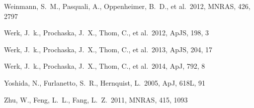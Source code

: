 \documentclass[useAMS,usenatbib]{mn2e}
\def \apj {ApJ}
\def \mnras {MNRAS}
\def \apjs {ApJS}
\begin{document}
\begin{thebibliography}{}
   Weinmann, S.~M., Pasquali, A., Oppenheimer, B.~D., et al.\ 2012, \mnras, 426, 2797 

 Werk, J.~k., Prochaska, J.~X., Thom, C., et al.\ 2012, \apjs, 198, 3

 Werk, J.~k., Prochaska, J.~X., Thom, C., et al.\ 2013, \apjs, 204, 17

 Werk, J.~k., Prochaska, J.~X., Thom, C., et al.\ 2014, \apj, 792, 8



Yoshida, N., Furlanetto, S.~R., Hernquist, L.\ 2005, \apj, 618L, 91


 Zhu, W., Feng, L.~L., Fang, L.~Z.\ 2011, \mnras, 415, 1093

\end{thebibliography}

\label{lastpage}
\end{document}
